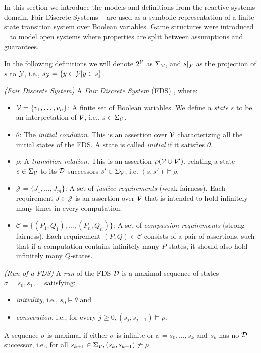 
In this section we introduce the models and definitions from the reactive systems domain. Fair Discrete Systems ~\cite{kesten2000verification} are used as a symbolic representation of a finite state transition system over Boolean variables. Game structures were introduced ~\cite{bloem2012synthesis} to model open systems where properties are split between assumptions and guarantees.

In the following definitions we will denote $2^{{\mathcal{V}}}$ as $\Sigma_{{\mathcal{V}}}$, and $s|_{{\mathcal{Y}}}$ as the projection of $s$ to ${\mathcal{Y}}$, i.e., $s_{{\mathcal{Y}}} = \{y \in {\mathcal{Y}} | y \in s \}$.

\begin{definition}
	\label{def:FDS} \emph{(Fair Discrete System)} 
	A \emph{Fair Discrete System} (FDS) \fdsDef, where:
	\begin{itemize}
		\item ${\mathcal{V}} = \{v_1,\ldots,v_n \}$: A finite set of Boolean variables. We define a \emph{state} $s$ to be an interpretation of ${\mathcal{V}}$, i.e., $s \in \Sigma_{{\mathcal{V}}}$.
		\item $\theta$: The \emph{initial condition}. This is an assertion over ${\mathcal{V}}$ characterizing all the initial states of the FDS. A state is called \emph{initial} if it satisfies $\theta$.
		\item $\rho$: A \emph{transition relation}. This is an assertion $\rho({\mathcal{V}} \cup {\mathcal{V}}')$, relating a state $s \in \Sigma_{{\mathcal{V}}}$ to its $\mathcal{D}$-successors $s' \in \Sigma_{{\mathcal{V}}}$, i.e. $(s,s') \models \rho$.
		\item $\mathcal{J} = \{J_1, \ldots, J_m \}$: A set of \emph{justice requirements} (weak fairness). Each requirement $J \in \mathcal{J}$ is an assertion over ${\mathcal{V}}$ that is intended to hold infinitely many times in every computation.
		\item $\mathcal{C} = \{(P_1,Q_1), \ldots, (P_n,Q_n) \}$: A set of \emph{compassion requirements} (strong fairness). Each requirement $(P,Q) \in \mathcal{C}$ consists of a pair of assertions, such that if a computation contains infinitely many $P$-states, it should also hold infinitely many $Q$-states.
	\end{itemize}
\end{definition}

\begin{definition}
	\label{def:fds_run} \emph{(Run of a FDS)} 
	A \emph{run} of the FDS $\mathcal{D}$ is a maximal sequence of states $\sigma = s_0,s_1,\ldots$
	satisfying:
	\begin{itemize}
		\item \emph{initiality}, i.e., $s_0\models \theta$ and
		\item \emph{consecution}, i.e., for every $j\geq 0, (s_j, s_{j+1})\models \rho$.
	\end{itemize}
	A sequence $\sigma$ is maximal if either $\sigma$ is infinite or $\sigma=s_0,\ldots,s_k$ and $s_k$ has no $\mathcal{D}$-successor, i.e., for all $s_{k+1} \in \Sigma_{{\mathcal{V}}}, (s_k,s_{k+1}) \not\models \rho$
\end{definition}


